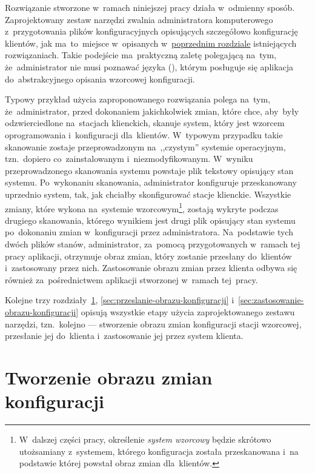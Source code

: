 \documentclass[thesis]{subfiles}
\begin{document}
Rozwiązanie stworzone w~ramach niniejszej pracy działa w~odmienny sposób. Zaprojektowany zestaw narzędzi zwalnia administratora komputerowego z~przygotowania plików konfiguracyjnych opisujących szczegółowo konfigurację klientów, jak ma~to~miejsce w~opisanych w~\hyperref[ch:istniejace-rozwiazania]{poprzednim rozdziale} istniejących rozwiązaniach. Takie podejście ma~praktyczną zaletę polegającą na~tym, że~administrator nie musi poznawać języka (), którym posługuje się aplikacja do~abstrakcyjnego opisania wzorcowej konfiguracji.

Typowy przykład użycia zaproponowanego rozwiązania polega na~tym, że~administrator, przed dokonaniem jakichkolwiek zmian, które chce, aby~były odzwierciedlone na~stacjach klienckich, skanuje system, który jest wzorcem oprogramowania i~konfiguracji dla~klientów. W~typowym przypadku takie skanowanie zostaje przeprowadzonym na~,,czystym'' systemie operacyjnym, tzn.~dopiero co~zainstalowanym i~niezmodyfikowanym. W~wyniku przeprowadzonego skanowania systemu powstaje plik tekstowy opisujący stan systemu. Po~wykonaniu skanowania, administrator konfiguruje przeskanowany uprzednio system, tak, jak chciałby skonfigurować stacje klienckie. Wszystkie zmiany, które wykona na~systemie wzorcowym\footnote{W~dalszej części pracy, określenie \emph{system wzorcowy} będzie skrótowo utożsamiany z~systemem, którego konfiguracja została przeskanowana i~na podstawie której powstał obraz zmian dla~klientów.}, zostają wykryte podczas drugiego skanowania, którego wynikiem jest drugi plik opisujący stan systemu po~dokonaniu zmian w~konfiguracji przez administratora. Na~podstawie tych dwóch plików stanów, administrator, za~pomocą przygotowanych w~ramach tej pracy aplikacji, otrzymuje obraz zmian, który zostanie przesłany do~klientów i~zastosowany przez nich. Zastosowanie obrazu zmian przez klienta odbywa się również za~pośrednictwem aplikacji stworzonej w~ramach tej~pracy.

Kolejne trzy rozdziały~\ref{sec:tworzenie-obrazu-konfiguracji}, \ref{sec:przeslanie-obrazu-konfiguracji} i~\ref{sec:zastosowanie-obrazu-konfiguracji} opisują wszystkie etapy użycia zaprojektowanego zestawu narzędzi, tzn.~kolejno --- stworzenie obrazu zmian konfiguracji stacji wzorcowej, przesłanie jej do~klienta i~zastosowanie jej przez system klienta.


\section{Tworzenie obrazu zmian konfiguracji}
\label{sec:tworzenie-obrazu-konfiguracji}
\end{document}
